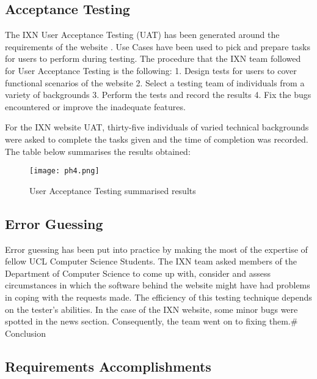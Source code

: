 \documentclass[fontsize=11pt]{extarticle}
\numberwithin{figure}{section} %
\begin{document}
\hypertarget{acceptance-testing}{%
\subsection{Acceptance Testing}\label{acceptance-testing}}

The IXN User Acceptance Testing (UAT) has been generated around the
requirements of the website \cite{g7} . Use Cases have been used to pick
and prepare tasks for users to perform during testing. The procedure
that the IXN team followed for User Acceptance Testing is the following:
1. Design tests for users to cover functional scenarios of the website
2. Select a testing team of individuals from a variety of backgrounds 3.
Perform the tests and record the results 4. Fix the bugs encountered or
improve the inadequate features.

For the IXN website UAT, thirty-five individuals of varied technical
backgrounds were asked to complete the tasks given and the time of
completion was recorded. The table below summarises the results
obtained:

\begin{figure}[H]
      \centering
      \texttt{[image: ph4.png]}
      \caption{User Acceptance Testing summarised results}
 \end{figure}

\hypertarget{error-guessing}{%
\subsection{Error Guessing}\label{error-guessing}}

Error guessing has been put into practice by making the most of the
expertise of fellow UCL Computer Science Students. The IXN team asked
members of the Department of Computer Science to come up with, consider
and assess circumstances in which the software behind the website might
have had problems in coping with the requests made. The efficiency of
this testing technique depends on the tester's abilities. In the case of
the IXN website, some minor bugs were spotted in the news section.
Consequently, the team went on to fixing them.\# Conclusion

\hypertarget{requirements-accomplishments}{%
\subsection{Requirements
Accomplishments}\label{requirements-accomplishments}}
\end{document}
